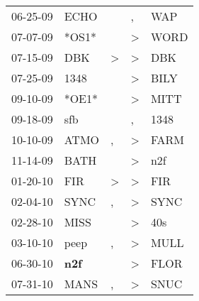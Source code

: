 \begin{supertabular}{p{0.07\textwidth}p{0.06\textwidth}p{0.02\textwidth}p{0.02\textwidth}p{0.06\textwidth}}
          06-25-09\textsuperscript{} &           ECHO\textsuperscript{} &                  &                , &            WAP\textsuperscript{} \\
          07-07-09\textsuperscript{} &                            *OS1* &                  &     \textgreater &           WORD\textsuperscript{} \\
          07-15-09\textsuperscript{} &            DBK\textsuperscript{} &     \textgreater &     \textgreater &            DBK\textsuperscript{} \\
          07-25-09\textsuperscript{} &           1348\textsuperscript{} &                  &     \textgreater &           BILY\textsuperscript{} \\
          09-10-09\textsuperscript{} &                            *OE1* &                  &     \textgreater &           MITT\textsuperscript{} \\
          09-18-09\textsuperscript{} &            sfb\textsuperscript{} &                  &                , &           1348\textsuperscript{} \\
          10-10-09\textsuperscript{} &           ATMO\textsuperscript{} &                , &     \textgreater &           FARM\textsuperscript{} \\
          11-14-09\textsuperscript{} &           BATH\textsuperscript{} &                  &     \textgreater &            n2f\textsuperscript{} \\
          01-20-10\textsuperscript{} &            FIR\textsuperscript{} &     \textgreater &     \textgreater &            FIR\textsuperscript{} \\
          02-04-10\textsuperscript{} &           SYNC\textsuperscript{} &                , &     \textgreater &           SYNC\textsuperscript{} \\
          02-28-10\textsuperscript{} &           MISS\textsuperscript{} &                  &     \textgreater &            40s\textsuperscript{} \\
          03-10-10\textsuperscript{} &           peep\textsuperscript{} &                , &     \textgreater &           MULL\textsuperscript{} \\
          06-30-10\textsuperscript{} &   \textbf{n2f\textsuperscript{}} &                  &     \textgreater &           FLOR\textsuperscript{} \\
          07-31-10\textsuperscript{} &           MANS\textsuperscript{} &                , &     \textgreater &           SNUC\textsuperscript{} \\

\end{supertabular}
